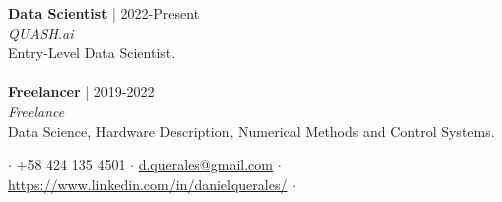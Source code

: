 \documentclass[5pt]{article} %
\begin{document}
\textbf{Data Scientist} | 2022-Present\\
\emph{QUASH.ai} \\
Entry-Level Data Scientist.\\
\\
\textbf{Freelancer} | 2019-2022 \\ 
\emph{Freelance} \\
Data Science, Hardware Description, Numerical Methods and Control Systems.

\vfill
\centering
$\cdot$
+58 424 135 4501 %
$\cdot$
\href{mailto:d.querales@gmail.com}{d.querales@gmail.com} 
$\cdot$ %
\url{https://www.linkedin.com/in/danielquerales/}
 $\cdot$ %
\end{document}
